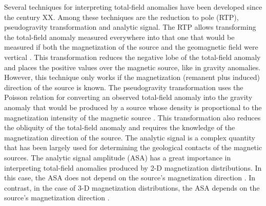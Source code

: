 \documentclass[journal abbreviation, npg]{copernicus}
\begin{document}
Several techniques for interpreting total-field anomalies have been developed since the century XX. Among these techniques are the reduction to pole (RTP), pseudogravity transformation and analytic signal. The RTP allows transforming the total-field anomaly measured everywhere into that one that would be measured if both the magnetization of the source and the geomagnetic field were vertical \citep{baranov1957, baranov-naudy1964, silva1986}. This transformation reduces the negative lobe of the total-field anomaly and places the positive values over the magnetic source, like in gravity anomalies. However, this technique only works if the magnetization (remanent plus induced) direction of the source is known. The pseudogravity transformation uses the Poisson relation for converting an observed total-field anomaly into the gravity anomaly that would be produced by a source whose density is proportional to the magnetization intensity of the magnetic source \citep{baranov1957}. This transformation also reduces the obliquity of the total-field anomaly and requires the knowledge of the magnetization direction of the source. The analytic signal is a complex quantity that has been largely used for determining the geological contacts of the magnetic sources. The analytic signal amplitude (ASA) has a great importance in interpreting total-field anomalies produced by 2-D magnetization distributions. In this case, the ASA does not depend on the source's magnetization direction \citep{nabighian1972, nabighian1974}. In contrast, in the case of 3-D magnetization distributions, the ASA depends on the source's magnetization direction \citep{nabighian1984, li2006}.
\end{document}
